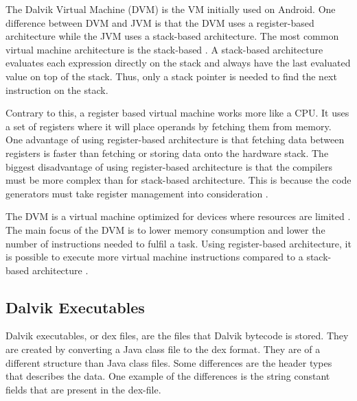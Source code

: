 
The Dalvik Virtual Machine (DVM) is the VM initially used on Android. One difference between DVM and JVM is that the DVM uses a register-based architecture while the JVM uses a stack-based architecture. The most common virtual machine architecture is the stack-based \cite[p.~158]{craig2010virtual}. A stack-based architecture evaluates each expression directly on the stack and always have the last evaluated value on top of the stack. Thus, only a stack pointer is needed to find the next instruction on the stack.

Contrary to this, a register based virtual machine works more like a CPU. It uses a set of registers where it will place operands by fetching them from memory. One advantage of using register-based architecture is that fetching data between registers is faster than fetching or storing data onto the hardware stack. The biggest disadvantage of using register-based architecture is that the compilers must be more complex than for stack-based architecture. This is because the code generators must take register management into consideration \cite[p.~159-160]{craig2010virtual}.

The DVM is a virtual machine optimized for devices where resources are limited \cite{android:dalvik:internals}. The main focus of the DVM is to lower memory consumption and lower the number of instructions needed to fulfil a task. Using register-based architecture, it is possible to execute more virtual machine instructions compared to a stack-based architecture \cite{shi2008virtual}. 





\subsection{Dalvik Executables}
Dalvik executables, or dex files, are the files that Dalvik bytecode is stored. They are created by converting a Java class file to the dex format. They are of a different structure than Java class files. Some differences are the header types that describes the data. One example of the differences is the string constant fields that are present in the dex-file. %

